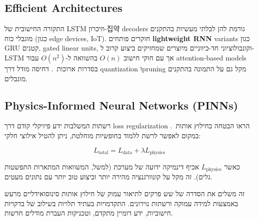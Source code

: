 \subsection{Efficient Architectures}

התקורה החישובית של \textenglish{LSTM} וזיכרון-집약 decoders גורמת להן לבלתי מעשיות בהתקנים מוגבלי כוח (כגון \textenglish{edge devices}, \textenglish{IoT}). חוקרים פותחים \textbf{lightweight RNN} variants כגון \textenglish{GRU} קטנים, \textenglish{gated linear units}, וקונבולוציוני חד-כיווניים מיוצרים שמחזיקים ביצוע קרוב ל-\textenglish{LSTM} אך עם חוקי חישוב \(O(n)\) בהשוואה ל-\(O(n^2)\) עבור \textenglish{attention}-based models בסדרות ארוכות~\cite{vaswani2017attention}. דחיסה מודל דרך quantization וpruning מקל גם על התמונה בהתקנים מוגבלים.

\subsection{Physics-Informed Neural Networks (PINNs)}

רשתות המשלבות ידע פיזיקלי קודם דרך loss regularization הראו הבטחה בחילוץ אותות~\cite{yao2023react}. במקום לאפשר לרשת ללמוד בחופשיות מוחלטת, ניתן להטיל אילוצי חלקי:

\begin{equation}
L_{\text{total}} = L_{\text{data}} + \lambda L_{\text{physics}}
\end{equation}

כאשר \(L_{\text{physics}}\) אכיף דינמיקה ידועה של מערכת (למשל, המשוואות המתארות התפשטות גלים). זה מקל על קונוורגנציה מהירה יותר וביצוע טוב יותר עם נתונים מעטים.

זה משלים את הסדרה של שש פרקים לתיאור עמוק של חילוץ אותות סינוסואידליים מרעש באמצעות למידה עמוקה ורשתות נוירונים. התקדמויות בעתיד תלויות בשילוב של בדקויות חישוביות, ידע דומיין מתקדם, וטכניקות העברת מודלים חדשות.